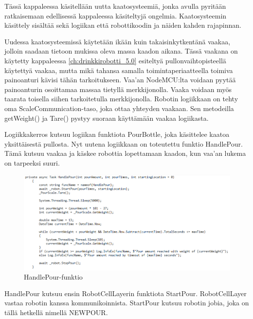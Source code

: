 Tässä kappaleessa käsitellään uutta kaatosysteemiä, jonka avulla pyritään ratkaisemaan edellisessä kappaleessa käsiteltyjä ongelmia. Kaatosysteemin käsittely sisältää sekä logiikan että robottikoodin ja näiden kahden rajapinnan.

Uudessa kaatosysteemissä käytetään ikään kuin takaisinkytkentänä vaakaa, jolloin saadaan tietoon mukissa oleva massa kaadon aikana. Tässä vaakana on käytetty kappaleessa \ref{ch:drinkkirobotti_5.0} esiteltyä pullonvaihtopisteellä käytettyä vaakaa, mutta mikä tahansa samalla toimintaperiaatteella toimiva painoanturi kävisi tähän tarkoitukseen. Vaa'an NodeMCU:lta voidaan pyytää painoanturin osoittamaa massaa tietyllä merkkijonolla. Vaaka voidaan myös taarata toisella siihen tarkoitetulla merkkijonolla. Robotin logiikkaan on tehty oma ScaleCommunication-taso, joka ottaa yhteyden vaakaan. Sen metodeilla getWeight() ja Tare() pystyy suoraan käyttämään vaakaa logiikasta.


Logiikkakerros kutsuu logiikan funktiota PourBottle, joka käsittelee kaatoa yksittäisestä pullosta. Nyt uutena logiikkaan on toteutettu funktio HandlePour. Tämä kutsuu vaakaa ja käskee robottia lopettamaan kaadon, kun vaa'an lukema on tarpeeksi suuri.

\begin{figure}[h]
\begin{center}
\includegraphics[scale=0.6]{img/HandlePour.png}
\end{center}
\caption{HandlePour-funktio}
\label{fig:HandlePour}
\end{figure}

\lstset{style=sharpc}


HandlePour kutsuu ensin RobotCellLayerin funktiota StartPour. RobotCellLayer vastaa robotin kanssa kommunikoinnista. StartPour kutsuu robotin jobia, joka on tällä hetkellä nimellä NEWPOUR.


